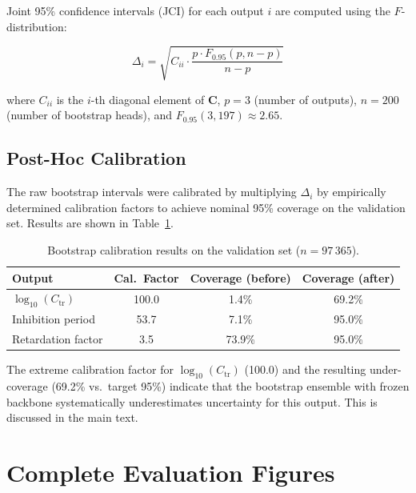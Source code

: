 \documentclass[journal=mamobx,manuscript=suppinfo]{achemso}
\begin{document}
Joint 95\% confidence intervals (JCI) for each output $i$ are computed
using the $F$-distribution:

\begin{equation}
  \Delta_i = \sqrt{C_{ii} \cdot \frac{p \cdot F_{0.95}(p, n-p)}{n-p}}
\end{equation}

\noindent where $C_{ii}$ is the $i$-th diagonal element of $\mathbf{C}$,
$p = 3$ (number of outputs), $n = 200$ (number of bootstrap heads), and
$F_{0.95}(3, 197) \approx 2.65$.

\subsection{Post-Hoc Calibration}

The raw bootstrap intervals were calibrated by multiplying $\Delta_i$ by
empirically determined calibration factors to achieve nominal 95\% coverage
on the validation set. Results are shown in Table~\ref{tab:calibration}.

\begin{table}[htbp]
\centering
\caption{Bootstrap calibration results on the validation set
  ($n = 97\,365$).}
\label{tab:calibration}
\begin{tabular}{@{}lccc@{}}
\toprule
Output & Cal.\ Factor & Coverage (before) & Coverage (after) \\
\midrule
$\log_{10}(C_{\mathrm{tr}})$ & 100.0 & 1.4\% & 69.2\% \\
Inhibition period & 53.7 & 7.1\% & 95.0\% \\
Retardation factor & 3.5 & 73.9\% & 95.0\% \\
\bottomrule
\end{tabular}
\end{table}

\noindent The extreme calibration factor for $\log_{10}(C_{\mathrm{tr}})$
(100.0) and the resulting under-coverage (69.2\% vs.\ target 95\%) indicate
that the bootstrap ensemble with frozen backbone systematically
underestimates uncertainty for this output. This is discussed in the main
text.

\section{Complete Evaluation Figures}
\label{sec:figures}
\end{document}
